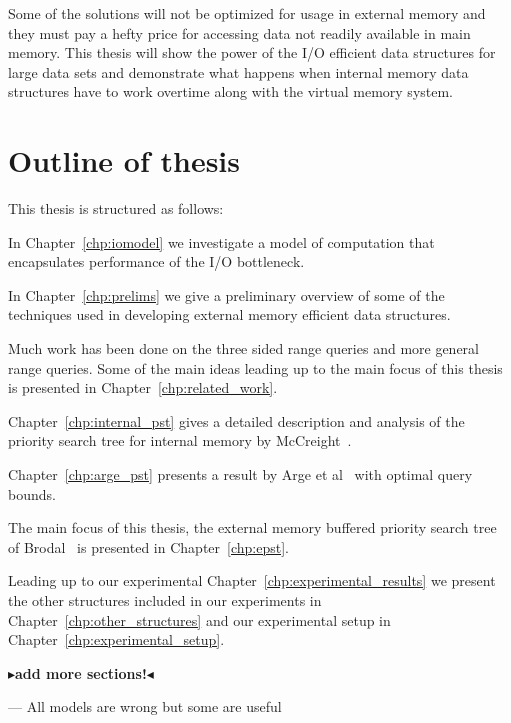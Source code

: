 \documentclass[twoside,11pt,openright]{report}
\newcommand{\todo}[1]{{\color[rgb]{.5,0,0}\textbf{$\blacktriangleright$#1$\blacktriangleleft$}}}
\begin{document}
Some of the solutions will not be optimized for usage in external memory and they must pay a hefty price for accessing data not readily available in main memory. This thesis will show the power of the I/O efficient data structures for large data sets and demonstrate what happens when internal memory data structures have to work overtime along with the virtual memory system.

\section{Outline of thesis}
This thesis is structured as follows:

In Chapter~\ref{chp:iomodel} we investigate a model of computation that encapsulates performance of the I/O bottleneck.

In Chapter~\ref{chp:prelims} we give a preliminary overview of some of the techniques used in developing external memory efficient data structures.

Much work has been done on the three sided range queries and more general range queries. Some of the main ideas leading up to the main focus of this thesis is presented in Chapter~\ref{chp:related_work}.


Chapter~\ref{chp:internal_pst} gives a detailed description and analysis of the priority search tree for internal memory by McCreight~\cite{DBLP:journals/siamcomp/McCreight85}.

Chapter~\ref{chp:arge_pst} presents a result by Arge et al~\cite{arge_samoladas_vitter_1999} with optimal query bounds.

The main focus of this thesis, the external memory buffered priority search tree of Brodal~\cite{DBLP:journals/corr/Brodal15} is presented in Chapter~\ref{chp:epst}.

Leading up to our experimental Chapter~\ref{chp:experimental_results} we present the other structures included in our experiments in Chapter~\ref{chp:other_structures} and our experimental setup in Chapter~\ref{chp:experimental_setup}.

\todo{add more sections!}



\begin{savequote}[0.5\textwidth]
--- All models are wrong but some are useful
\end{savequote}
\end{document}
